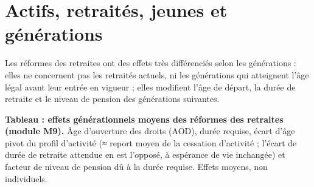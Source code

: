 \documentclass[
  11pt,
  11pt,
  a4paper,
  openany]{book}
\begin{document}
\hypertarget{sec:generations}{%
\section{Actifs, retraités, jeunes et
générations}\label{sec:generations}}

Les réformes des retraites ont des effets très différenciés selon les
générations : elles ne concernent pas les retraités actuels, ni les
générations qui atteignent l'âge légal avant leur entrée en vigueur ;
elles modifient l'âge de départ, la durée de retraite et le niveau de
pension des générations suivantes.

\textbf{Tableau : effets générationnels moyens des réformes des
retraites (module M9).} Âge d'ouverture des droits (AOD), durée requise,
écart d'âge pivot du profil d'activité (≈ report moyen de la cessation
d'activité ; l'écart de durée de retraite attendue en est l'opposé, à
espérance de vie inchangée) et facteur de niveau de pension dû à la
durée requise. Effets moyens, non individuels.
\end{document}
